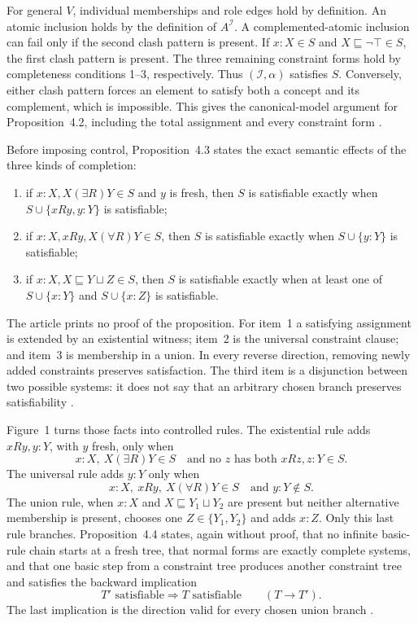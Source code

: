 For general \(V\), individual memberships and role edges hold by
definition.  An atomic inclusion holds by the definition of
\(A^{\mathcal I}\).  A complemented-atomic inclusion can fail only if the
second clash pattern is present.  If \(x:X\in S\) and
\(X\sqsubseteq\neg\top\in S\), the first clash pattern is present.  The three
remaining constraint forms hold by completeness conditions 1--3,
respectively.  Thus \((\mathcal I,\alpha)\) satisfies \(S\).
Conversely, either clash pattern forces an element to satisfy both a
concept and its complement, which is impossible.
This gives the canonical-model argument for
Proposition~4.2, including the total assignment and every constraint form
\cite[Prop.~4.2, p.~11]{SchmidtSchaussSmolka1991}.

Before imposing control, Proposition~4.3 states the exact semantic effects of
the three kinds of completion:
\begin{enumerate}
\item if \(x:X,X(\exists R)Y\in S\) and \(y\) is fresh, then \(S\) is
      satisfiable exactly when
      \(S\cup\{xRy,y:Y\}\) is satisfiable;
\item if \(x:X,xRy,X(\forall R)Y\in S\), then \(S\) is satisfiable exactly
      when \(S\cup\{y:Y\}\) is satisfiable;
\item if \(x:X,X\sqsubseteq Y\sqcup Z\in S\), then \(S\) is satisfiable
      exactly when at least one of
      \(S\cup\{x:Y\}\) and \(S\cup\{x:Z\}\) is satisfiable.
\end{enumerate}
The article prints no proof of the proposition.  For item~1 a satisfying
assignment is extended by an existential witness; item~2 is the universal
constraint clause; and item~3 is membership in a union.  In every reverse
direction, removing newly added constraints preserves satisfaction.  The
third item is a disjunction between two possible systems: it does not say that
an arbitrary chosen branch preserves satisfiability
\cite[Prop.~4.3, p.~12]{SchmidtSchaussSmolka1991}.

Figure~1 turns those facts into controlled rules.  The existential rule adds
\(xRy,y:Y\), with \(y\) fresh, only when
\[
 x:X,\ X(\exists R)Y\in S
 \quad\text{and no }z\text{ has both }xRz,z:Y\in S.
\]
The universal rule adds \(y:Y\) only when
\[
 x:X,\ xRy,\ X(\forall R)Y\in S
 \quad\text{and }y:Y\notin S.
\]
The union rule, when \(x:X\) and \(X\sqsubseteq Y_1\sqcup Y_2\) are present
but neither alternative membership is present, chooses one
\(Z\in\{Y_1,Y_2\}\) and adds \(x:Z\).  Only this last rule branches.
Proposition~4.4 states, again without proof, that no infinite basic-rule chain
starts at a fresh tree, that normal forms are exactly complete systems, and
that one basic step from a constraint tree produces another constraint tree
and satisfies the backward implication
\[
 T'\text{ satisfiable}\Longrightarrow T\text{ satisfiable}
 \qquad(T\to T').
\]
The last implication is the direction valid for every chosen union branch
\cite[Fig.~1 and Prop.~4.4, p.~12]{SchmidtSchaussSmolka1991}.

